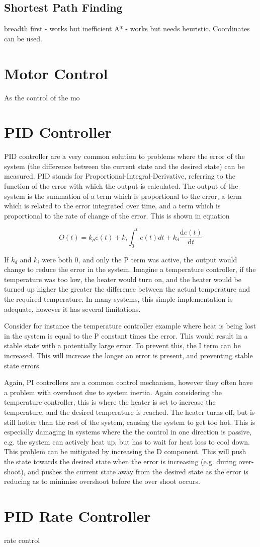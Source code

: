 \subsection{Shortest Path Finding}\label{litreview/maze/path}
breadth first - works but inefficient
A* - works but needs heuristic. Coordinates can be used. 

\section{Motor Control}\label{litreview/control}

As the control of the mo

\section{PID Controller}\label{litreview/control/pid}
PID controller are a very common solution to problems where the error of the system (the difference between the current state and the desired state) can be measured. PID stands for Proportional-Integral-Derivative, referring to the function of the error with which the output is calculated. The output of the system is the summation of a term which is proportional to the error, a term which is related to the error integrated over time, and a term which is proportional to the rate of change of the error. This is shown in equation 

$$ O(t) = k_{p}e(t) + k_i\int_{0}^{t}e(t)dt + k_d \frac{\mathrm{d} e(t) }{\mathrm{d} t}$$

If $k_d$ and $k_i$ were both 0, and only the P term was active, the output would change to reduce the error in the system. Imagine a temperature controller, if the temperature was too low, the heater would turn on, and the heater would be turned up higher the greater the difference between the actual temperature and the required temperature. In many systems, this simple implementation is adequate, however it has several limitations. 

Consider for instance the temperature controller example where heat is being lost in the system is equal to the P constant times the error. This would result in a stable state with a potentially large error. To prevent this, the I term can be increased. This will increase the longer an error is present, and preventing stable state errors. 

Again, PI controllers are a common control mechanism, however they often have a problem with overshoot due to system inertia. Again considering the temperature controller, this is where the heater is set to increase the temperature, and the desired temperature is reached. The heater turns off, but is still hotter than the rest of the system, causing the system to get too hot. This is especially damaging in systems where the the control in one direction is passive, e.g. the system can actively heat up, but has to wait for heat loss to cool down. This problem can be mitigated by increasing the D component. This will push the state towards the desired state when the error is increasing (e.g. during over-shoot), and pushes the current state away from the desired state as the error is reducing as to minimise overshoot before the over shoot occurs.

\section{PID Rate Controller}\label{litreview/control/pid}
rate control


